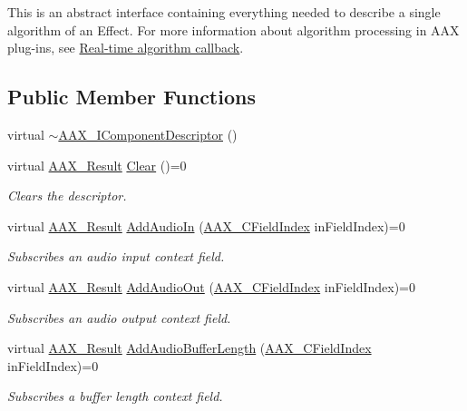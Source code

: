 This is an abstract interface containing everything needed to describe a single algorithm of an Effect. For more information about algorithm processing in A\+A\+X plug-\/ins, see \hyperlink{a00327}{Real-\/time algorithm callback}. \subsection*{Public Member Functions}
\begin{DoxyCompactItemize}
\item 
virtual \hyperlink{a00088_a15a049b75d57c81d6201c18c6800a6da}{$\sim$\+A\+A\+X\+\_\+\+I\+Component\+Descriptor} ()
\item 
virtual \hyperlink{a00149_a4d8f69a697df7f70c3a8e9b8ee130d2f}{A\+A\+X\+\_\+\+Result} \hyperlink{a00088_a0ba6941428a6e272f72a6fadb474394f}{Clear} ()=0
\begin{DoxyCompactList}\small\item\em Clears the descriptor. \end{DoxyCompactList}\item 
virtual \hyperlink{a00149_a4d8f69a697df7f70c3a8e9b8ee130d2f}{A\+A\+X\+\_\+\+Result} \hyperlink{a00088_a5fad32eff268756c9b4309431321f9b3}{Add\+Audio\+In} (\hyperlink{a00149_ae807f8986143820cfb5d6da32165c9c7}{A\+A\+X\+\_\+\+C\+Field\+Index} in\+Field\+Index)=0
\begin{DoxyCompactList}\small\item\em Subscribes an audio input context field. \end{DoxyCompactList}\item 
virtual \hyperlink{a00149_a4d8f69a697df7f70c3a8e9b8ee130d2f}{A\+A\+X\+\_\+\+Result} \hyperlink{a00088_afea50c52b3c2e68eef2857b75859a954}{Add\+Audio\+Out} (\hyperlink{a00149_ae807f8986143820cfb5d6da32165c9c7}{A\+A\+X\+\_\+\+C\+Field\+Index} in\+Field\+Index)=0
\begin{DoxyCompactList}\small\item\em Subscribes an audio output context field. \end{DoxyCompactList}\item 
virtual \hyperlink{a00149_a4d8f69a697df7f70c3a8e9b8ee130d2f}{A\+A\+X\+\_\+\+Result} \hyperlink{a00088_a55d6cdb4a9c860c9ed4cb685e346f0dc}{Add\+Audio\+Buffer\+Length} (\hyperlink{a00149_ae807f8986143820cfb5d6da32165c9c7}{A\+A\+X\+\_\+\+C\+Field\+Index} in\+Field\+Index)=0
\begin{DoxyCompactList}\small\item\em Subscribes a buffer length context field. \end{DoxyCompactList}\item 

\end{DoxyCompactItemize}
